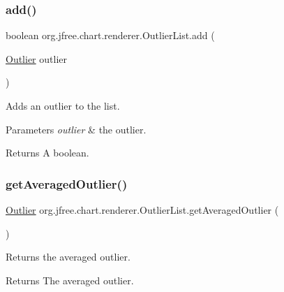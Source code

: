 \subsubsection{\texorpdfstring{add()}{add()}}
{\footnotesize\ttfamily boolean org.\+jfree.\+chart.\+renderer.\+Outlier\+List.\+add (\begin{DoxyParamCaption}\item[{\mbox{\hyperlink{classorg_1_1jfree_1_1chart_1_1renderer_1_1_outlier}{Outlier}}}]{outlier }\end{DoxyParamCaption})}

Adds an outlier to the list.


\begin{DoxyParams}{Parameters}
{\em outlier} & the outlier.\\
\hline
\end{DoxyParams}
\begin{DoxyReturn}{Returns}
A boolean. 
\end{DoxyReturn}
\mbox{\label{classorg_1_1jfree_1_1chart_1_1renderer_1_1_outlier_list_a12276b247a7177a300937760e82a0d46}} 
\subsubsection{\texorpdfstring{get\+Averaged\+Outlier()}{getAveragedOutlier()}}
{\footnotesize\ttfamily \mbox{\hyperlink{classorg_1_1jfree_1_1chart_1_1renderer_1_1_outlier}{Outlier}} org.\+jfree.\+chart.\+renderer.\+Outlier\+List.\+get\+Averaged\+Outlier (\begin{DoxyParamCaption}{ }\end{DoxyParamCaption})}

Returns the averaged outlier.

\begin{DoxyReturn}{Returns}
The averaged outlier. 
\end{DoxyReturn}
\mbox{\label{classorg_1_1jfree_1_1chart_1_1renderer_1_1_outlier_list_ae3017a62b7d0704a322cc14eed0c739c}} 
